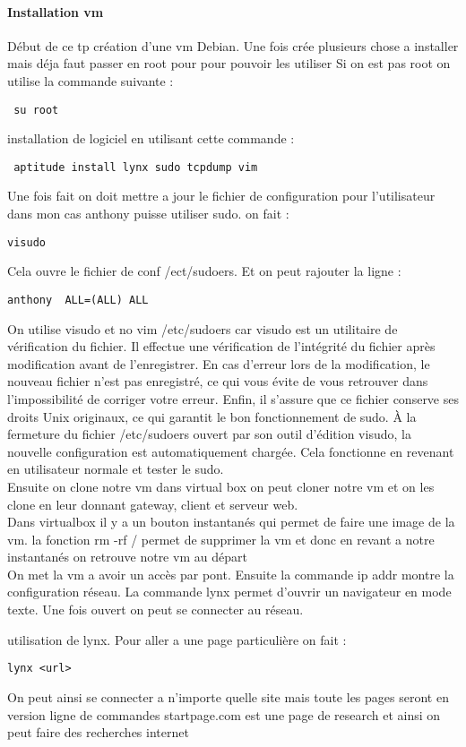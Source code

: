 \documentclass[a4paper,12pt]{article}
\begin{document}
 
\paragraph{ Installation vm}
Début de ce tp création d'une vm Debian.
Une fois crée plusieurs chose a installer mais déja faut passer en root pour pour pouvoir les utiliser
Si on est pas root on utilise la commande suivante :
\begin{verbatim}
 su root
\end{verbatim}

installation de logiciel en utilisant cette commande :
\begin{verbatim}
 aptitude install lynx sudo tcpdump vim
\end{verbatim}

Une fois fait on doit mettre a jour le fichier de configuration pour l'utilisateur dans mon cas anthony puisse utiliser sudo.
on fait :
\begin{verbatim}
visudo
\end{verbatim}
Cela ouvre le fichier de conf /ect/sudoers. Et on peut rajouter la ligne : 
\begin{verbatim}
anthony  ALL=(ALL) ALL
\end{verbatim}
On utilise visudo et no vim /etc/sudoers car visudo est un utilitaire de vérification du fichier.
Il effectue une vérification de l'intégrité du fichier après modification avant de l'enregistrer. En cas d'erreur lors de la modification, le nouveau fichier n'est pas enregistré, ce qui vous évite de vous retrouver dans l'impossibilité de corriger votre erreur. Enfin, il s'assure que ce fichier conserve ses droits Unix originaux, ce qui garantit le bon fonctionnement de sudo.
À la fermeture du fichier /etc/sudoers ouvert par son outil d'édition visudo, la nouvelle configuration est automatiquement chargée. 
Cela fonctionne en revenant en utilisateur normale et tester le sudo.\\

Ensuite on clone notre vm dans virtual box on peut cloner notre vm et on les clone en leur donnant
gateway, client et serveur web.\\

Dans virtualbox il y a un bouton instantanés qui permet de faire une image de la vm.
la fonction rm -rf / permet de supprimer la vm et donc en revant a notre instantanés on retrouve notre vm au départ\\


On met la vm a avoir un accès par pont. Ensuite la commande ip addr montre la configuration réseau.
La commande lynx permet d'ouvrir un navigateur en mode texte.
Une fois ouvert on peut se connecter au réseau.
 
utilisation de lynx. Pour aller a une page particulière on fait :
\begin{verbatim}
lynx <url>
\end{verbatim}

On peut ainsi se connecter a n'importe quelle site mais toute les pages seront en version ligne de commandes
startpage.com est une page de research et ainsi on peut faire des recherches internet
\end{document}
